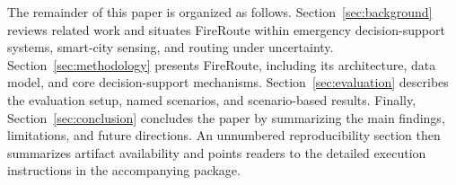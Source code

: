 The remainder of this paper is organized as follows. Section~\ref{sec:background} reviews related work and situates FireRoute within emergency decision-support systems, smart-city sensing, and routing under uncertainty. Section~\ref{sec:methodology} presents FireRoute, including its architecture, data model, and core decision-support mechanisms. Section~\ref{sec:evaluation} describes the evaluation setup, named scenarios, and scenario-based results. Finally, Section~\ref{sec:conclusion} concludes the paper by summarizing the main findings, limitations, and future directions. An unnumbered reproducibility section then summarizes artifact availability and points readers to the detailed execution instructions in the accompanying package.